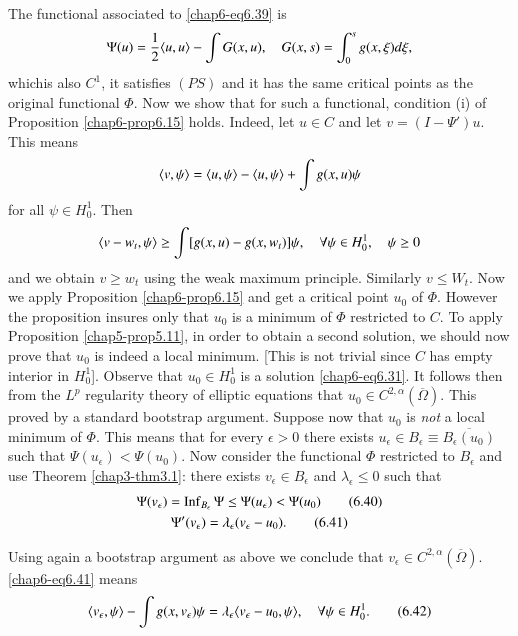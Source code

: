 The functional associated to \eqref{chap6-eq6.39} is
$$
\Psi (u)=\frac{1}{2}\langle u,u\rangle -\int G(x,u),\quad
G(x,s)=\int^{s}_{0}g(x,\xi)d\xi, 
$$
which\pageoriginale is also $C^{1}$, it satisfies $(PS)$ and it has
the same critical points as the original functional $\Phi$. Now we
show that for such a functional, condition (i) of Proposition
\ref{chap6-prop6.15} holds. Indeed, let $u\in C$ and let
$v=(I-\Psi')u$. This means
$$
\langle v,\psi\rangle =\langle u,\psi\rangle -\langle u,\psi\rangle +\int g(x,u)\psi
$$
for all $\psi\in H^{1}_{0}$. Then
$$
\langle v-w_{t},\psi\rangle \geq \int [g(x,u)-g(x,w_{t})]\psi,\quad \forall \psi
\in H^{1}_{0},\quad \psi\geq 0
$$
and we obtain $v\geq w_{t}$ using the weak maximum
principle. Similarly $v\leq W_{t}$. Now we apply Proposition
\ref{chap6-prop6.15} and get a critical point $u_{0}$ of
$\Phi$. However the proposition insures only that $u_{0}$ is a minimum
of $\Phi$ restricted to $C$. To apply Proposition
\ref{chap5-prop5.11}, in order to obtain a second solution, we should
now prove that $u_{0}$ is indeed a local minimum. [This is not trivial
  since $C$ has empty interior in $H^{1}_{0}$]. Observe that $u_{0}\in
H^{1}_{0}$ is a solution \eqref{chap6-eq6.31}. It follows then from
the $L^{p}$ regularity theory of elliptic equations that $u_{0}\in
C^{2,\alpha}(\overline{\Omega})$. This proved by a standard bootstrap
argument. Suppose now that $u_{0}$ is {\em not} a local minimum of
$\Phi$. This means that for every $\epsilon>0$ there exists
$u_{\epsilon}\in B_{\epsilon}\equiv \overline{B_{\epsilon}(u_{0})}$
such that $\Psi(u_{\epsilon})<\Psi(u_{0})$. Now consider the
functional $\Phi$ restricted to $B_{\epsilon}$ and use Theorem
\ref{chap3-thm3.1}: there exists $v_{\epsilon}\in B_{\epsilon}$ and
$\lambda_{\epsilon}\leq 0$ such that
\begin{gather*}
\Psi(v_{\epsilon})=\operatorname{Inf}_{B_{\epsilon}}\Psi\leq
\Psi(u_{\epsilon})<\Psi(u_{0})\tag{6.40}\label{chap6-eq6.40}\\
\Psi'(v_{\epsilon})=\lambda_{\epsilon}(v_{\epsilon}-u_{0}).\tag{6.41}\label{chap6-eq6.41} 
\end{gather*}

Using again a bootstrap argument as above we conclude that
$v_{\epsilon}\in
C^{2,\alpha}(\overline{\Omega})$. \eqref{chap6-eq6.41} means
\begin{equation*}
\langle v_{\epsilon},\psi\rangle -\int
g(x,v_{\epsilon})\psi=\lambda_{\epsilon}\langle
v_{\epsilon}-u_{0},\psi\rangle,\quad \forall \psi\in
H^{1}_{0}.\tag{6.42}\label{chap6-eq6.42} 
\end{equation*}

